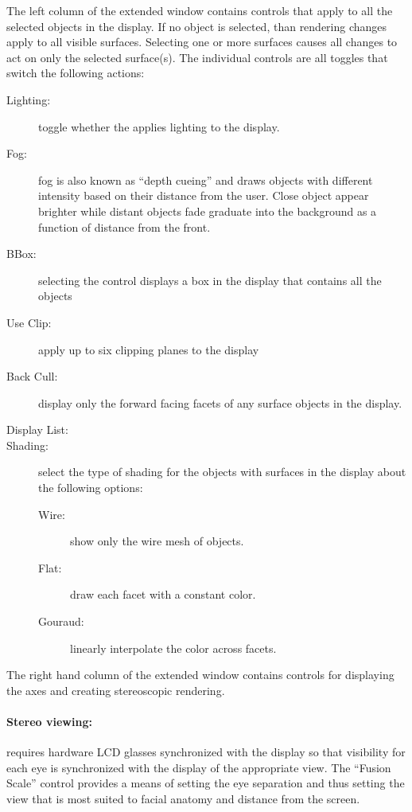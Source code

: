 The left column of the  extended \viewer{} window contains controls that
apply to all the selected objects in the display.  If no object is
selected, than rendering changes apply to all visible surfaces.  Selecting
one or more surfaces
causes all changes to act on only the selected surface(s).  The individual
controls are all toggles that switch the following actions:
\begin{description}
  \item [Lighting: ] toggle whether the \viewer{} applies lighting to the
        display. 
  \item [Fog: ] fog is also known as ``depth cueing'' and draws objects
        with different intensity based on their distance from the user.
        Close object appear brighter while distant objects fade graduate
        into the background as a function of distance from the front. 
  \item [BBox: ] selecting the control displays a box in the display that
        contains all the objects 
  \item [Use Clip: ] apply up to six clipping planes to the display
  \item [Back Cull: ] display only the forward facing facets of any surface
        objects in the display.
  \item [Display List: ]
  \item [Shading: ] select the type of shading for the objects with
        surfaces in the display about the following options:
        \begin{description}
          \item [Wire: ] show only the wire mesh of objects.
          \item [Flat: ] draw each facet with a constant color.
          \item [Gouraud: ] linearly interpolate the color across facets. 
        \end{description}
\end{description}

The right hand column of the extended \viewer{} window contains controls
for displaying the axes and creating stereoscopic rendering.  

\paragraph{Stereo viewing: } requires hardware LCD glasses synchronized
with the display so that visibility for each eye is synchronized with the
display of the appropriate view.  The ``Fusion Scale'' control provides a
means of setting the eye separation and thus setting the view that is most
suited to facial anatomy and distance from the screen.

